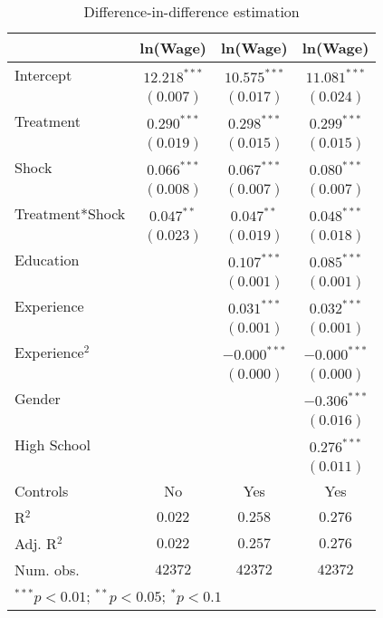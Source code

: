 
\begin{table}[H]
\caption{Difference-in-difference estimation}
\begin{center}
\begin{tabular}{l c c c}
\hline
 & ln(Wage) & ln(Wage) & ln(Wage) \\
\hline
Intercept       & $12.218^{***}$ & $10.575^{***}$ & $11.081^{***}$ \\
                & $(0.007)$      & $(0.017)$      & $(0.024)$      \\
Treatment       & $0.290^{***}$  & $0.298^{***}$  & $0.299^{***}$  \\
                & $(0.019)$      & $(0.015)$      & $(0.015)$      \\
Shock           & $0.066^{***}$  & $0.067^{***}$  & $0.080^{***}$  \\
                & $(0.008)$      & $(0.007)$      & $(0.007)$      \\
Treatment*Shock & $0.047^{**}$   & $0.047^{**}$   & $0.048^{***}$  \\
                & $(0.023)$      & $(0.019)$      & $(0.018)$      \\
Education       &                & $0.107^{***}$  & $0.085^{***}$  \\
                &                & $(0.001)$      & $(0.001)$      \\
Experience      &                & $0.031^{***}$  & $0.032^{***}$  \\
                &                & $(0.001)$      & $(0.001)$      \\
Experience$^2$  &                & $-0.000^{***}$ & $-0.000^{***}$ \\
                &                & $(0.000)$      & $(0.000)$      \\
Gender          &                &                & $-0.306^{***}$ \\
                &                &                & $(0.016)$      \\
High School     &                &                & $0.276^{***}$  \\
                &                &                & $(0.011)$      \\
\hline
Controls        & No             & Yes            & Yes            \\
R$^2$           & $0.022$        & $0.258$        & $0.276$        \\
Adj. R$^2$      & $0.022$        & $0.257$        & $0.276$        \\
Num. obs.       & $42372$        & $42372$        & $42372$        \\
\hline
\multicolumn{4}{l}{\scriptsize{$^{***}p<0.01$; $^{**}p<0.05$; $^{*}p<0.1$}}
\end{tabular}
\label{table:coefficients}
\end{center}
\end{table}
